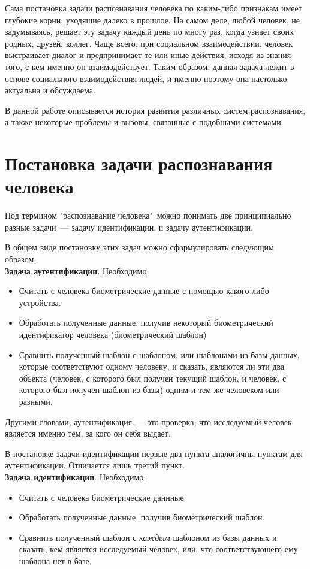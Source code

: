 \documentclass[14pt, a4paper]{extarticle}
\begin{document}
Сама постановка задачи распознавания человека по каким-либо признакам имеет глубокие корни, уходящие далеко в прошлое. На самом деле, любой человек, не задумываясь, решает эту задачу каждый день по многу раз, когда узнаёт своих родных, друзей, коллег. Чаще всего, при социальном взаимодействии, человек выстраивает диалог и предпринимает те или иные действия, исходя из знания того, с кем именно он взаимодействует. Таким образом, данная задача лежит в основе социального взаимодействия людей, и именно поэтому она настолько актуальна и обсуждаема.

В данной работе описывается история развития различных систем распознавания, а также некоторые проблемы и вызовы, связанные с подобными системами.

\newpage
\section{Постановка задачи распознавания человека}
Под термином "распознавание человека"\ можно понимать две принципиально разные задачи~--- задачу идентификации, и задачу аутентификации. 


В общем виде постановку этих задач можно сформулировать следующим образом. \\
\textbf{Задача аутентификации}. Необходимо:
\begin{itemize}
	\item Считать с человека биометрические данные с помощью какого-либо устройства.
	\item Обработать полученные данные, получив некоторый биометрический идентификатор человека (биометрический шаблон)
	\item Сравнить полученный шаблон с шаблоном, или шаблонами из базы данных, которые соответствуют одному человеку, и сказать, являются ли эти два объекта (человек, с которого был получен текущий шаблон, и человек, с которого был получен шаблон из базы) одним и тем же человеком или разными.
\end{itemize}

Другими словами, аутентификация~--- это проверка, что исследуемый человек является именно тем, за кого он себя выдаёт.

В постановке задачи идентификации первые два пункта аналогичны пунктам для аутентификации. Отличается лишь третий пункт.\\
\textbf{Задача идентификации}. Необходимо:
\begin{itemize}
	\item Считать с человека биометрические даннные
	\item Обработать полученные данные, получив биометрический шаблон.
	\item Сравнить полученный шаблон с \textit{каждым} шаблоном из базы данных и сказать, кем является исследуемый человек, или, что соответствующего ему шаблона нет в базе.
\end{itemize}
\end{document}
